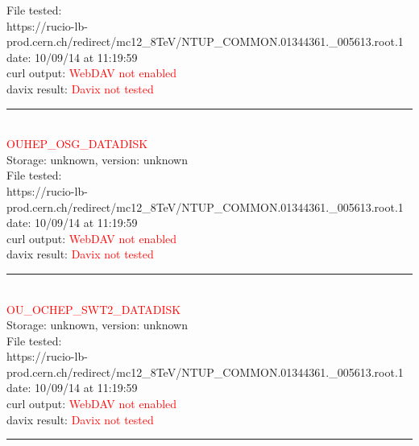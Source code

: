 File tested:\\
\footnotesize{https://rucio-lb-prod.cern.ch/redirect/mc12\_8TeV/NTUP\_COMMON.01344361.\_005613.root.1}\\

date: 10/09/14 at 11:19:59\\

curl output:  \textcolor{red}{WebDAV not enabled}\\

davix result:  \textcolor{red}{Davix not tested}\\

\rule{\textwidth}{1pt}\\

\textcolor{red}{\normalsize{OUHEP\_OSG\_DATADISK}}\\

Storage: unknown, version: unknown\\

File tested:\\
\footnotesize{https://rucio-lb-prod.cern.ch/redirect/mc12\_8TeV/NTUP\_COMMON.01344361.\_005613.root.1}\\

date: 10/09/14 at 11:19:59\\

curl output:  \textcolor{red}{WebDAV not enabled}\\

davix result:  \textcolor{red}{Davix not tested}\\

\rule{\textwidth}{1pt}\\

\textcolor{red}{\normalsize{OU\_OCHEP\_SWT2\_DATADISK}}\\

Storage: unknown, version: unknown\\

File tested:\\
\footnotesize{https://rucio-lb-prod.cern.ch/redirect/mc12\_8TeV/NTUP\_COMMON.01344361.\_005613.root.1}\\

date: 10/09/14 at 11:19:59\\

curl output:  \textcolor{red}{WebDAV not enabled}\\

davix result:  \textcolor{red}{Davix not tested}\\

\rule{\textwidth}{1pt}\\

